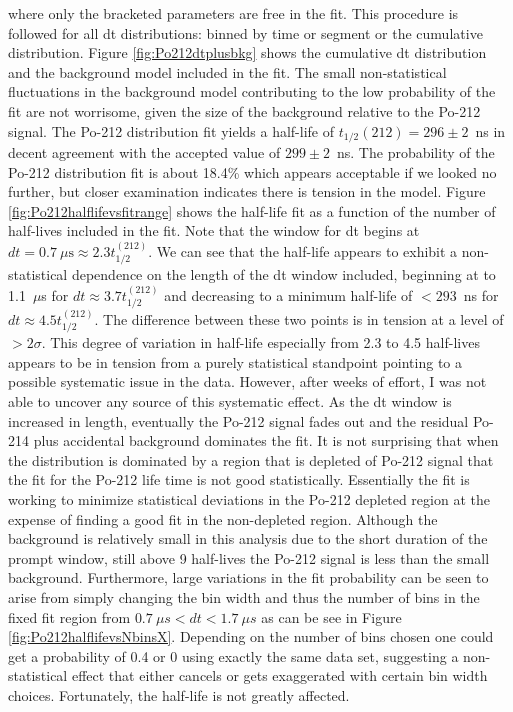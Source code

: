 where only the bracketed parameters are free in the fit. This procedure is followed for all dt distributions: binned by time or segment or the cumulative distribution. Figure \ref{fig:Po212dtplusbkg} shows the cumulative dt distribution and the background model included in the fit. The small non-statistical fluctuations in the background model contributing to the low probability of the fit are not worrisome, given the size of the background relative to the Po-212 signal. The Po-212 distribution fit yields a half-life of $t_{1/2}(212)=296\pm2$~ns in decent agreement with the accepted value of $299\pm2$~ns.  The probability of the Po-212 distribution fit is about 18.4\% which appears acceptable if we looked no further, but closer examination indicates there is tension in the model. Figure \ref{fig:Po212halflifevsfitrange} shows the half-life fit as a function of the number of half-lives included in the fit. Note that the window for dt begins at $dt=0.7~\mu\textrm{s}\approx2.3t_{1/2}^{(212)}$. We can see that the half-life appears to exhibit a non-statistical dependence on the length of the dt window included, beginning at to 1.1~$\mu$s for $dt\approx3.7t_{1/2}^{(212)}$ and decreasing to a minimum half-life of $<293$~ns for $dt\approx4.5t_{1/2}^{(212)}$. The difference between these two points is in tension at a level of $>2\sigma$. This degree of variation in half-life especially from 2.3 to 4.5 half-lives appears to be in tension from a purely statistical standpoint pointing to a possible systematic issue in the data. However, after weeks of effort, I was not able to uncover any source of this systematic effect. As the dt window is increased in length, eventually the Po-212 signal fades out and the residual Po-214 plus accidental background dominates the fit. It is not surprising that when the distribution is dominated by a region that is depleted of Po-212 signal that the fit for the Po-212 life time is not good statistically. Essentially the fit is working to minimize statistical deviations in the Po-212 depleted region at the expense of finding a good fit in the non-depleted region. Although the background is relatively small in this analysis due to the short duration of the prompt window, still above 9 half-lives the Po-212 signal is less than the small background. Furthermore, large variations in the fit probability can be seen to arise from simply changing the bin width and thus the number of bins in the fixed fit region from $0.7~\mu s<dt<1.7~\mu s$ as can be see in Figure \ref{fig:Po212halflifevsNbinsX}. Depending on the number of bins chosen one could get a probability of 0.4 or 0 using exactly the same data set, suggesting a non-statistical effect that either cancels or gets exaggerated with certain bin width choices. Fortunately, the half-life is not greatly affected. 
